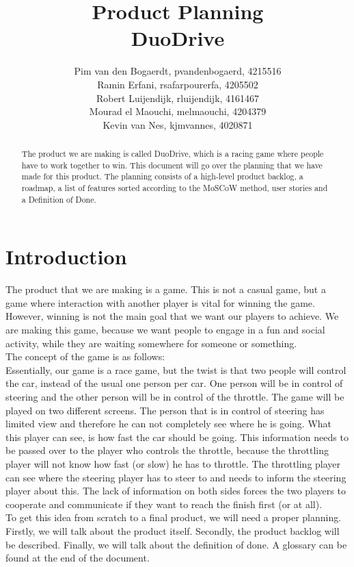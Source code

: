 \documentclass[11pt,twoside,a4paper]{article}
\title{
  Product Planning\\
  DuoDrive
}
\author{
	Pim van den Bogaerdt, pvandenbogaerd, 4215516\\
	Ramin Erfani, rsafarpourerfa, 4205502\\
	Robert Luijendijk, rluijendijk, 4161467\\
	Mourad el Maouchi, melmaouchi, 4204379\\
	Kevin van Nes, kjmvannes, 4020871
}
\begin{document}
\maketitle

\newpage

\begin{abstract}
The product we are making is called DuoDrive, which is a racing game where people have to work together to win. This document will go over the planning that we have made for this product. The planning consists of a high-level product backlog, a roadmap, a list of features sorted according to the MoSCoW method, user stories and a Definition of Done.
\end{abstract}

\newpage

\section{Introduction}
The product that we are making is a game. This is not a casual game, but a game where interaction with another player is vital for winning the game. However, winning is not the main goal that we want our players to achieve. We are making this game, because we want people to engage in a fun and social activity, while they are waiting somewhere for someone or something.\\
The concept of the game is as follows:\\
Essentially, our game is a race game, but the twist is that two people will control the car, instead of the usual one person per car. One person will be in control of steering and the other person will be in control of the throttle. The game will be played on two different screens. The person that is in control of steering has limited view and therefore he can not completely see where he is going. What this player can see, is how fast the car should be going. This information needs to be passed over to the player who controls the throttle, because the throttling player will not know how fast (or slow) he has to throttle. The throttling player can see where the steering player has to steer to and needs to inform the steering player about this. The lack of information on both sides forces the two players to cooperate and communicate if they want to reach the finish first (or at all).\\
To get this idea from scratch to a final product, we will need a proper planning. Firstly, we will talk about the product itself. Secondly, the product backlog will be described. Finally, we will talk about the definition of done. A glossary can be found at the end of the document.
\end{document}
